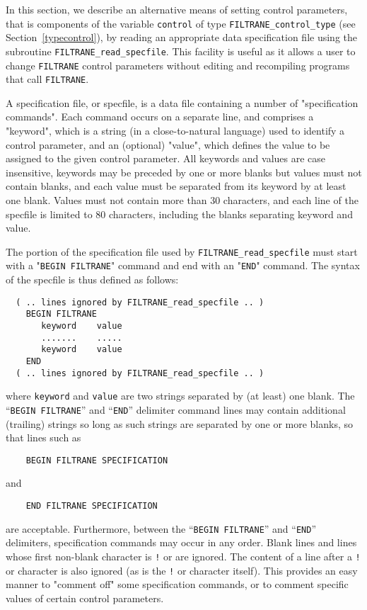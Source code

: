 \documentclass{galahad}
\newcommand{\packagename}{FILTRANE}
\begin{document}

\galfeatures
\noindent In this section, we describe an alternative means of setting 
control parameters, that is components of the variable {\tt control} of type
{\tt \packagename\_control\_type}
(see Section~\ref{typecontrol}), 
by reading an appropriate data specification file using the
subroutine {\tt \packagename\_read\_specfile}. This facility
is useful as it allows a user to change  {\tt \packagename} control parameters 
without editing and recompiling programs that call {\tt \packagename}.

A specification file, or specfile, is a data file containing a number of 
"specification commands". Each command occurs on a separate line, 
and comprises a "keyword", 
which is a string (in a close-to-natural language) used to identify a 
control parameter, and 
an (optional) "value", which defines the value to be assigned to the given
control parameter. All keywords and values are case insensitive, 
keywords may be preceded by one or more blanks but
values must not contain blanks, and
each value must be separated from its keyword by at least one blank.
Values must not contain more than 30 characters, and 
each line of the specfile is limited to 80 characters,
including the blanks separating keyword and value.

The portion of the specification file used by {\tt \packagename\_read\_specfile}
must start with a "{\tt BEGIN \packagename}" command and end with an 
"{\tt END}" command.  The syntax of the specfile is thus defined as follows:
\begin{verbatim}
  ( .. lines ignored by FILTRANE_read_specfile .. )
    BEGIN FILTRANE
       keyword    value
       .......    .....
       keyword    value
    END 
  ( .. lines ignored by FILTRANE_read_specfile .. )
\end{verbatim}
where {\tt keyword} and {\tt value} are two strings separated by (at least) one
blank. The ``{\tt BEGIN \packagename}'' and ``{\tt END}'' delimiter command
lines  may contain additional (trailing) strings so long as such strings are 
separated by one or more blanks, so that lines such as
\begin{verbatim}
    BEGIN FILTRANE SPECIFICATION
\end{verbatim}
and
\begin{verbatim}
    END FILTRANE SPECIFICATION
\end{verbatim}
are acceptable. Furthermore, between the
``{\tt BEGIN \packagename}'' and ``{\tt END}'' delimiters,
specification commands may occur in any order.  Blank lines and
lines whose first non-blank character is {\tt !} or {\tt *} are ignored. 
The content of a line after a {\tt !} or {\tt *} character is also 
ignored (as is the {\tt !} or {\tt *}
character itself). This provides an easy manner to "comment off" some 
specification commands, or to comment specific values 
of certain control parameters.  
\end{document}
